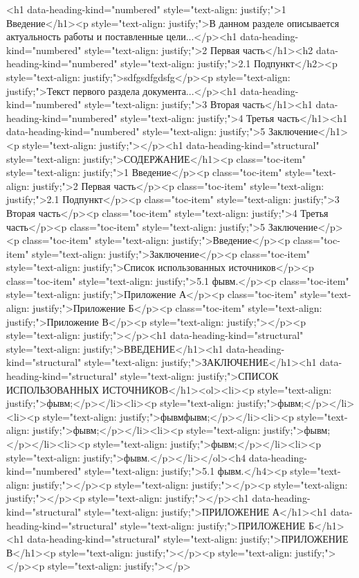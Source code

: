 \documentclass[paper=a4, fontsize=14pt, pagesize, DIV=calc, oneside]{scrreport}
\begin{document}
\pagestyle{empty} 



\newpage
\tableofcontents
\newpage

\pagestyle{plain}
\setcounter{page}{2} 

<h1 data-heading-kind="numbered" style="text-align: justify;">1 Введение</h1><p style="text-align: justify;">В данном разделе описывается актуальность работы и поставленные цели...</p><h1 data-heading-kind="numbered" style="text-align: justify;">2 Первая часть</h1><h2 data-heading-kind="numbered" style="text-align: justify;">2.1 Подпункт</h2><p style="text-align: justify;">sdfgsdfgdsfg</p><p style="text-align: justify;">Текст первого раздела документа...</p><h1 data-heading-kind="numbered" style="text-align: justify;">3 Вторая часть</h1><h1 data-heading-kind="numbered" style="text-align: justify;">4 Третья часть</h1><h1 data-heading-kind="numbered" style="text-align: justify;">5 Заключение</h1><p style="text-align: justify;"></p><h1 data-heading-kind="structural" style="text-align: justify;">СОДЕРЖАНИЕ</h1><p class="toc-item" style="text-align: justify;">1 Введение</p><p class="toc-item" style="text-align: justify;">2 Первая часть</p><p class="toc-item" style="text-align: justify;">2.1 Подпункт</p><p class="toc-item" style="text-align: justify;">3 Вторая часть</p><p class="toc-item" style="text-align: justify;">4 Третья часть</p><p class="toc-item" style="text-align: justify;">5 Заключение</p><p class="toc-item" style="text-align: justify;">Введение</p><p class="toc-item" style="text-align: justify;">Заключение</p><p class="toc-item" style="text-align: justify;">Список использованных источников</p><p class="toc-item" style="text-align: justify;">5.1 фывм.</p><p class="toc-item" style="text-align: justify;">Приложение А</p><p class="toc-item" style="text-align: justify;">Приложение Б</p><p class="toc-item" style="text-align: justify;">Приложение В</p><p style="text-align: justify;"></p><p style="text-align: justify;"></p><h1 data-heading-kind="structural" style="text-align: justify;">ВВЕДЕНИЕ</h1><h1 data-heading-kind="structural" style="text-align: justify;">ЗАКЛЮЧЕНИЕ</h1><h1 data-heading-kind="structural" style="text-align: justify;">СПИСОК ИСПОЛЬЗОВАННЫХ ИСТОЧНИКОВ</h1><ol><li><p style="text-align: justify;">фывм;</p></li><li><p style="text-align: justify;">фывм;</p></li><li><p style="text-align: justify;">фывмфывм;</p></li><li><p style="text-align: justify;">фывм;</p></li><li><p style="text-align: justify;">фывм;</p></li><li><p style="text-align: justify;">фывм;</p></li><li><p style="text-align: justify;">фывм.</p></li></ol><h4 data-heading-kind="numbered" style="text-align: justify;">5.1 фывм.</h4><p style="text-align: justify;"></p><p style="text-align: justify;"></p><p style="text-align: justify;"></p><p style="text-align: justify;"></p><h1 data-heading-kind="structural" style="text-align: justify;">ПРИЛОЖЕНИЕ А</h1><h1 data-heading-kind="structural" style="text-align: justify;">ПРИЛОЖЕНИЕ Б</h1><h1 data-heading-kind="structural" style="text-align: justify;">ПРИЛОЖЕНИЕ В</h1><p style="text-align: justify;"></p><p style="text-align: justify;"></p><p style="text-align: justify;"></p>

\newpage
\printbibliography[heading=bibintoc, title={Список использованных источников}]
\end{document}

